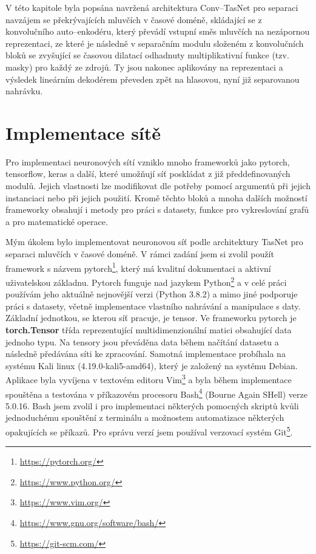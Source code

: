 V této kapitole byla popsána navržená architektura Conv--TasNet pro separaci navzájem se překrývajících mluvčích v časové doméně, skládající se z konvolučního auto--enkodéru, který převádí vstupní směs mluvčích na nezápornou reprezentaci, ze které je následně v separačním modulu složeném z konvolučních bloků se zvyšující se časovou dilatací odhadnuty multiplikativní funkce (tzv. masky) pro každý ze zdrojů. Ty jsou nakonec aplikovány na reprezentaci a výsledek lineárním dekodérem převeden zpět na hlasovou, nyní již separovanou nahrávku.



\chapter{Implementace sítě}
\label{implementace}
Pro implementaci neuronových sítí vzniklo mnoho frameworků jako pytorch, tensorflow, keras a další, které umožňují síť poskládat z již předdefinovaných modulů. Jejich vlastnosti lze modifikovat dle potřeby pomocí argumentů při jejich instanciaci nebo při jejich použití. Kromě těchto bloků a mnoha dalších možností frameworky obsahují i metody pro práci s datasety, funkce pro vykreslování grafů a pro matematické operace.

Mým úkolem bylo implementovat neuronovou síť podle architektury TasNet pro separaci mluvčích v časové doméně. V rámci zadání jsem si zvolil použít framework s názvem pytorch\footnote{\url{https://pytorch.org/}}, který má kvalitní dokumentaci a aktivní uživatelskou základnu. Pytorch funguje nad jazykem Python\footnote{\url{https://www.python.org/}} a v celé práci používám jeho aktuálně nejnovější verzi (Python 3.8.2) a mimo jiné podporuje práci s datasety, včetně implementace vlastního nahrávání a manipulace s daty. Základní jednotkou, se kterou síť pracuje, je tensor. Ve frameworku pytorch je \textbf{torch.Tensor} třída reprezentující multidimenzionální matici obsahující data jednoho typu. Na tensory jsou převáděna data během načítání datasetu a následně předávána síti ke zpracování. Samotná implementace probíhala na systému Kali linux (4.19.0-kali5-amd64), který je založený na systému Debian. Aplikace byla vyvíjena v textovém editoru Vim\footnote{\url{https://www.vim.org/}} a byla během implementace spouštěna a testována v příkazovém procesoru Bash\footnote{\url{https://www.gnu.org/software/bash/}} (Bourne Again SHell) verze 5.0.16. Bash jsem zvolil i pro implementaci některých pomocných skriptů kvůli jednoduchému spouštění z terminálu a možnostem automatizace některých opakujících se příkazů. Pro správu verzí jsem používal verzovací systém Git\footnote{\url{https://git-scm.com/}}.

